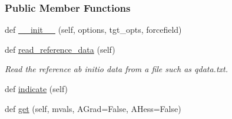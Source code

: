 \subsubsection*{Public Member Functions}
\begin{DoxyCompactItemize}
\item 
def \hyperlink{classsrc_1_1torsion__profile_1_1TorsionProfileTarget_a5b7676da29a7f8fb11b651155b1ba3bc}{\+\_\+\+\_\+init\+\_\+\+\_\+} (self, options, tgt\+\_\+opts, forcefield)
\item 
def \hyperlink{classsrc_1_1torsion__profile_1_1TorsionProfileTarget_a6c77e6f0409fe827e9b880bc26169062}{read\+\_\+reference\+\_\+data} (self)
\begin{DoxyCompactList}\small\item\em Read the reference ab initio data from a file such as qdata.\+txt. \end{DoxyCompactList}\item 
def \hyperlink{classsrc_1_1torsion__profile_1_1TorsionProfileTarget_a6da94528ad2084b76e9de3886785923b}{indicate} (self)
\item 
def \hyperlink{classsrc_1_1torsion__profile_1_1TorsionProfileTarget_a4a4d529b8da9b699f8d28e85f79e08a9}{get} (self, mvals, A\+Grad=False, A\+Hess=False)
\end{DoxyCompactItemize}
